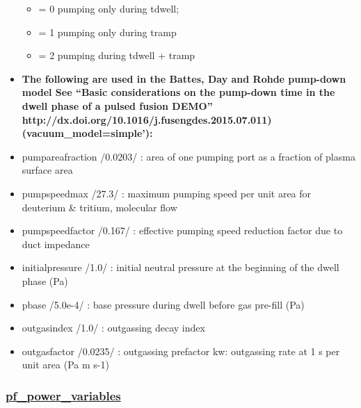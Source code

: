 \documentclass[]{article}
\providecommand{\tightlist}{%
  \setlength{\itemsep}{0pt}\setlength{\parskip}{0pt}}
\begin{document}
\begin{itemize}
  \begin{itemize}
  \tightlist
  \item
    = 0 pumping only during tdwell;
  \item
    = 1 pumping only during tramp
  \item
    = 2 pumping during tdwell + tramp
  \end{itemize}
\item
  \textbf{The following are used in the Battes, Day and Rohde pump-down
  model See ``Basic considerations on the pump-down time in the dwell
  phase of a pulsed fusion DEMO''
  http://dx.doi.org/10.1016/j.fusengdes.2015.07.011)
  (vacuum\_model=simple'):}
\item
  pumpareafraction /0.0203/ : area of one pumping port as a fraction of
  plasma surface area
\item
  pumpspeedmax /27.3/ : maximum pumping speed per unit area for
  deuterium \& tritium, molecular flow
\item
  pumpspeedfactor /0.167/ : effective pumping speed reduction factor due
  to duct impedance
\item
  initialpressure /1.0/ : initial neutral pressure at the beginning of
  the dwell phase (Pa)
\item
  pbase /5.0e-4/ : base pressure during dwell before gas pre-fill (Pa)
\item
  outgasindex /1.0/ : outgassing decay index
\item
  outgasfactor /0.0235/ : outgassing prefactor kw: outgassing rate at 1
  s per unit area (Pa m s-1)
\end{itemize}

\subsubsection{\texorpdfstring{\href{pf_power_variables.html}{pf\_power\_variables}}{pf\_power\_variables}}\label{pf_power_variables}
\end{document}
